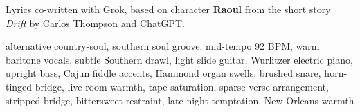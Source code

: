 

\begin{notes}
Lyrics co-written with Grok, based on character \textbf{Raoul} from the short story \emph{Drift} by Carlos Thompson and ChatGPT.
\end{notes}

\begin{style}
alternative country-soul, southern soul groove, mid-tempo 92 BPM, warm baritone vocals, subtle Southern drawl, light slide guitar, Wurlitzer electric piano, upright bass, Cajun fiddle accents, Hammond organ swells, brushed snare, horn-tinged bridge, live room warmth, tape saturation, sparse verse arrangement, stripped bridge, bittersweet restraint, late-night temptation, New Orleans warmth
\end{style}

